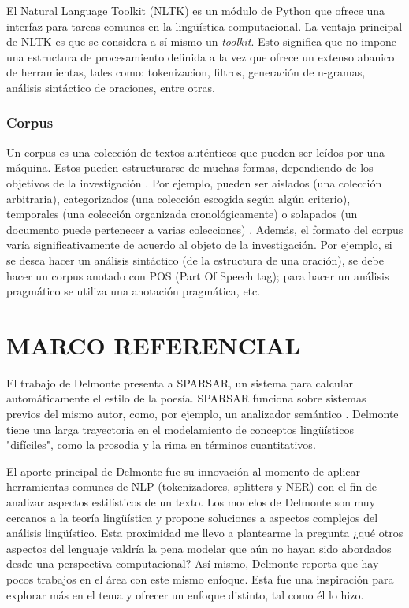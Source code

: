 \documentclass[twoside]{article}
\begin{document}
El Natural Language Toolkit (NLTK) es un módulo de Python que ofrece
una interfaz para tareas comunes en la lingüística computacional. La
ventaja principal de NLTK es que se considera a sí mismo un
\emph{toolkit}. Esto significa que no impone una estructura de
procesamiento definida a la vez que ofrece un extenso abanico de
herramientas, tales como: tokenizacion, filtros, generación de
n-gramas, análisis sintáctico de oraciones, entre otras.

\subsubsection{Corpus}
\label{sec:org947dc15}


Un corpus es una colección de textos auténticos que pueden ser
leídos por una máquina. Estos pueden estructurarse de muchas
formas, dependiendo de los objetivos de la investigación
\cite{indurkhya2010handbook}. Por ejemplo, pueden ser aislados (una
colección arbitraria), categorizados (una colección escogida según
algún criterio), temporales (una colección organizada
cronológicamente) o solapados (un documento puede pertenecer a
varias colecciones) \cite{bird2009natural}. Además, el formato del
corpus varía significativamente de acuerdo al objeto de la
investigación. Por ejemplo, si se desea hacer un análisis
sintáctico (de la estructura de una oración), se debe hacer un
corpus anotado con POS (Part Of Speech tag); para hacer un análisis
pragmático se utiliza una anotación pragmática, etc.

\section{MARCO REFERENCIAL}
\label{sec:orgc5593f3}

El trabajo de Delmonte \cite{delmonte2013computing} presenta a
SPARSAR, un sistema para calcular automáticamente el estilo de la
poesía. SPARSAR funciona sobre sistemas previos del mismo autor, como,
por ejemplo, un analizador semántico \cite{delmonte2005venses}.
Delmonte tiene una larga trayectoria en el modelamiento de conceptos
lingüísticos "difíciles", como la prosodia y la rima en términos
cuantitativos.

El aporte principal de Delmonte fue su innovación al momento de aplicar
herramientas comunes de NLP (tokenizadores, splitters y NER) con el fin
de analizar aspectos estilísticos de un texto. Los modelos de Delmonte
son muy cercanos a la teoría lingüística y propone soluciones a aspectos
complejos del análisis lingüístico. Esta proximidad me llevo a
plantearme la pregunta ¿qué otros aspectos del lenguaje valdría la pena
modelar que aún no hayan sido abordados desde una perspectiva
computacional? Así mismo, Delmonte reporta que hay pocos trabajos en el
área con este mismo enfoque. Esta fue una inspiración para explorar más
en el tema y ofrecer un enfoque distinto, tal como él lo hizo.
\end{document}
